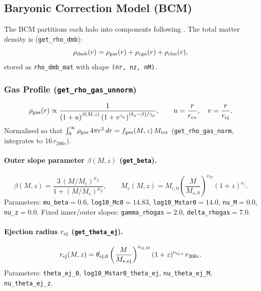 \documentclass[12pt,a4paper]{article}
\newcommand{\code}[1]{\texttt{\small #1}}
\newcommand{\param}[1]{\texttt{\small #1}}
\begin{document}
\subsection{Baryonic Correction Model (BCM)}
\label{sec:bcm}

The BCM partitions each halo into components following
\cite{Schneider2015,Schneider2019}. The total matter density is
(\code{get\_rho\_dmb}):
\begin{equation}
  \rho_{\rm dmb}(r) = \rho_{\rm gas}(r) + \rho_{\rm cga}(r) + \rho_{\rm clm}(r),
\end{equation}
stored as \code{rho\_dmb\_mat} with shape \code{(nr, nz, nM)}.

\subsubsection{Gas Profile (\code{get\_rho\_gas\_unnorm})}
\begin{equation}
  \rho_{\rm gas}(r) \propto
  \frac{1}{\left(1+u\right)^{\beta(M,z)}
  \left(1+v^{\gamma_\rho}\right)^{(\delta_\rho-\beta)/\gamma_\rho}},
  \qquad u = \frac{r}{r_{\rm co}},\quad v = \frac{r}{r_{\rm ej}}.
\end{equation}
Normalised so that $\int_0^\infty \rho_{\rm gas}\,4\pi r^2\,dr = f_{\rm gas}(M,z)\,M_{\rm tot}$
(\code{get\_rho\_gas\_norm}, integrates to $16\,r_{200c}$).

\paragraph{Outer slope parameter $\beta(M,z)$ (\code{get\_beta}).}
\begin{equation}
  \beta(M,z) = \frac{3\,(M/M_c)^{\mu_\beta}}{1+(M/M_c)^{\mu_\beta}},
  \qquad M_c(M,z) = M_{c,0}\left(\frac{M}{M_{\star,0}}\right)^{\nu_M}(1+z)^{\nu_z}.
\end{equation}
Parameters: \param{mu\_beta}$=0.6$, \param{log10\_Mc0}$=14.83$, \param{log10\_Mstar0}$=14.0$,
\param{nu\_M}$=0.0$, \param{nu\_z}$=0.0$.
Fixed inner/outer slopes: \param{gamma\_rhogas}$=2.0$, \param{delta\_rhogas}$=7.0$.

\paragraph{Ejection radius $r_{\rm ej}$ (\code{get\_theta\_ej}).}
\begin{equation}
  r_{\rm ej}(M,z) = \theta_{\rm ej,0}
  \left(\frac{M}{M_{\star,\rm ej}}\right)^{\nu_{\rm ej,M}}
  (1+z)^{\nu_{\rm ej,z}}\,r_{200c}.
\end{equation}
Parameters: \param{theta\_ej\_0}, \param{log10\_Mstar0\_theta\_ej},
\param{nu\_theta\_ej\_M}, \param{nu\_theta\_ej\_z}.
\end{document}
